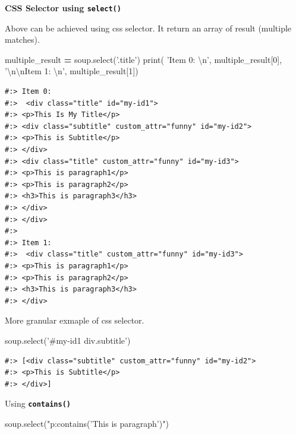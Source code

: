 \documentclass[
]{book}
\newenvironment{Shaded}{\begin{snugshade}}{\end{snugshade}}
\newcommand{\BuiltInTok}[1]{#1}
\newcommand{\CharTok}[1]{\textcolor[rgb]{0.5,0.5,0.5}{#1}}
\newcommand{\DecValTok}[1]{\textcolor[rgb]{0.06,0.06,0.06}{#1}}
\newcommand{\NormalTok}[1]{#1}
\newcommand{\OperatorTok}[1]{\textcolor[rgb]{0.43,0.43,0.43}{\textbf{#1}}}
\newcommand{\StringTok}[1]{\textcolor[rgb]{0.5,0.5,0.5}{#1}}
\begin{document}
\textbf{CSS Selector using \texttt{select()}}

Above can be achieved using css selector. It return an array of result (multiple matches).

\begin{Shaded}
\begin{Highlighting}[]
\NormalTok{multiple_result }\OperatorTok{=}\NormalTok{ soup.select(}\StringTok{'.title'}\NormalTok{)}
\BuiltInTok{print}\NormalTok{( }\StringTok{'Item 0: }\CharTok{\textbackslash{}n}\StringTok{'}\NormalTok{,     multiple_result[}\DecValTok{0}\NormalTok{],}
       \StringTok{'}\CharTok{\textbackslash{}n\textbackslash{}n}\StringTok{Item 1: }\CharTok{\textbackslash{}n}\StringTok{'}\NormalTok{, multiple_result[}\DecValTok{1}\NormalTok{])}
\end{Highlighting}
\end{Shaded}

\begin{verbatim}
#:> Item 0: 
#:>  <div class="title" id="my-id1">
#:> <p>This Is My Title</p>
#:> <div class="subtitle" custom_attr="funny" id="my-id2">
#:> <p>This is Subtitle</p>
#:> </div>
#:> <div class="title" custom_attr="funny" id="my-id3">
#:> <p>This is paragraph1</p>
#:> <p>This is paragraph2</p>
#:> <h3>This is paragraph3</h3>
#:> </div>
#:> </div> 
#:> 
#:> Item 1: 
#:>  <div class="title" custom_attr="funny" id="my-id3">
#:> <p>This is paragraph1</p>
#:> <p>This is paragraph2</p>
#:> <h3>This is paragraph3</h3>
#:> </div>
\end{verbatim}

More granular exmaple of css selector.

\begin{Shaded}
\begin{Highlighting}[]
\NormalTok{soup.select(}\StringTok{'#my-id1 div.subtitle'}\NormalTok{)}
\end{Highlighting}
\end{Shaded}

\begin{verbatim}
#:> [<div class="subtitle" custom_attr="funny" id="my-id2">
#:> <p>This is Subtitle</p>
#:> </div>]
\end{verbatim}

Using \textbf{\texttt{contains()}}

\begin{Shaded}
\begin{Highlighting}[]
\NormalTok{soup.select(}\StringTok{"p:contains('This is paragraph')"}\NormalTok{)}
\end{Highlighting}
\end{Shaded}
\end{document}

